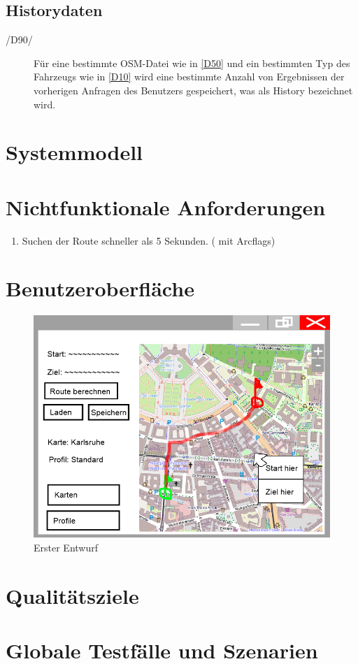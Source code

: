 \documentclass[a4paper, 11pt]{article}
\begin{document}
\subsection{Historydaten}
\begin{description}
\item [/D90/]
Für eine bestimmte OSM-Datei wie in \ref{D50} und ein bestimmten Typ des Fahrzeugs wie in \ref{D10} wird eine bestimmte Anzahl von Ergebnissen der vorherigen Anfragen des Benutzers gespeichert, was als History bezeichnet wird.  
\end{description}
\section{Systemmodell}
\section{Nichtfunktionale Anforderungen}

\begin{enumerate}
\item Suchen der Route schneller als 5 Sekunden. (  mit Arcflags)

\end{enumerate}
\section{Benutzeroberfläche}
\begin{figure}
\centering
\includegraphics[width=0.7\linewidth]{mockup_screenshot}
\caption{Erster Entwurf}
\label{fig:mockupscreenshot}
\end{figure}
\section{Qualitätsziele}
\section{Globale Testfälle und Szenarien}
\end{document}

